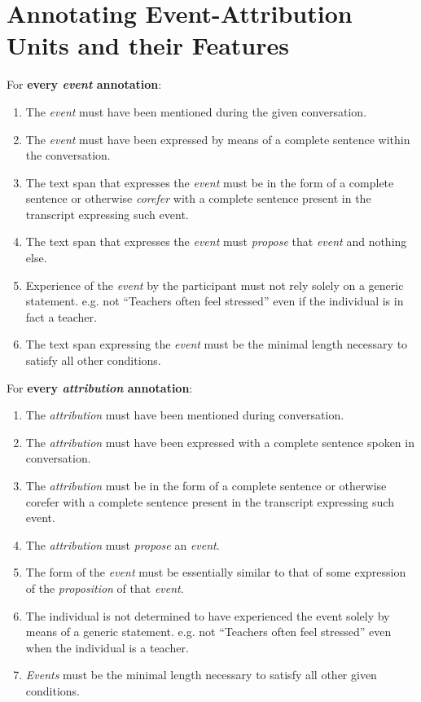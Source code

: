 \documentclass[a4paper,12pt]{article}
\begin{document}
\section{Annotating Event-Attribution Units and their Features}
    For \textbf{every \emph{event} annotation}:
        \begin{enumerate}
            \item The \emph{event} must have been mentioned during the given conversation.
            \item The \emph{event} must have been expressed by means of a complete sentence within the conversation.
            \item The text span that expresses the \emph{event} must be in the form of a complete sentence or otherwise \emph{corefer} with a complete sentence present in the transcript expressing such event.
            \item The text span that expresses the \emph{event} must \emph{propose} that \emph{event} and nothing else. %
            \item Experience of the \emph{event} by the participant must not rely solely on a generic statement.
                e.g. not ``Teachers often feel stressed'' even if the individual is in fact a teacher.
            \item The text span expressing the \emph{event} must be the minimal length necessary to satisfy all other conditions.
        \end{enumerate}

    For \textbf{every \emph{attribution} annotation}:
        \begin{enumerate}
            \item The \emph{attribution} must have been mentioned during conversation.
            \item The \emph{attribution} must have been expressed with a complete sentence spoken in conversation.
            \item The \emph{attribution} must be in the form of a complete sentence or otherwise corefer with a complete sentence present in the transcript expressing such event.
            \item The \emph{attribution} must \emph{propose} an \emph{event}.
            \item The form of the \emph{event} must be essentially similar to that of some expression of the \emph{proposition} of that \emph{event}. %
            \item The individual is not determined to have experienced the event solely by means of a generic statement. e.g. not ``Teachers often feel stressed'' even when the individual is a teacher.
            \item \emph{Events} must be the minimal length necessary to satisfy all other given conditions.
        \end{enumerate}
\end{document}
